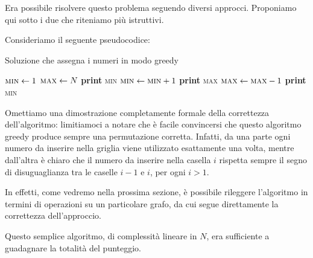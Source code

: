 
Era possibile risolvere questo problema seguendo diversi approcci. Proponiamo qui sotto i due che riteniamo più istruttivi.

\SolN

Consideriamo il seguente pseudocodice:

\begin{algorithm}
    \caption{Soluzione che assegna i numeri in modo greedy}\label{greedy}
    \begin{algorithmic}[1]
        \State $\textsc{min} \gets 1$
        \State $\textsc{max} \gets N$
             
                \State \textbf{print} \textsc{min}
                \State $\textsc{min} \gets \textsc{min}+1$
            \Else {}
                \State \textbf{print} \textsc{max}
                \State $\textsc{max} \gets \textsc{max}-1$
            \EndIf
        \EndFor
        \State \textbf{print} \textsc{min} 
    \EndProcedure
    \end{algorithmic}
\end{algorithm}

Omettiamo una dimostrazione completamente formale della correttezza dell'algoritmo: limitiamoci a notare che è facile convincersi che questo algoritmo greedy produce sempre una permutazione corretta. Infatti, da una parte ogni numero da inserire nella griglia viene utilizzato esattamente una volta, mentre dall'altra è chiaro che il numero da inserire nella casella $i$ rispetta sempre il segno di disuguaglianza tra le caselle $i-1$ e $i$, per ogni $i > 1$.

In effetti, come vedremo nella prossima sezione, è possibile rileggere l'algoritmo in termini di operazioni su un particolare grafo, da cui segue direttamente la correttezza dell'approccio.

Questo semplice algoritmo, di complessità lineare in $N$, era sufficiente a guadagnare la totalità del punteggio.

